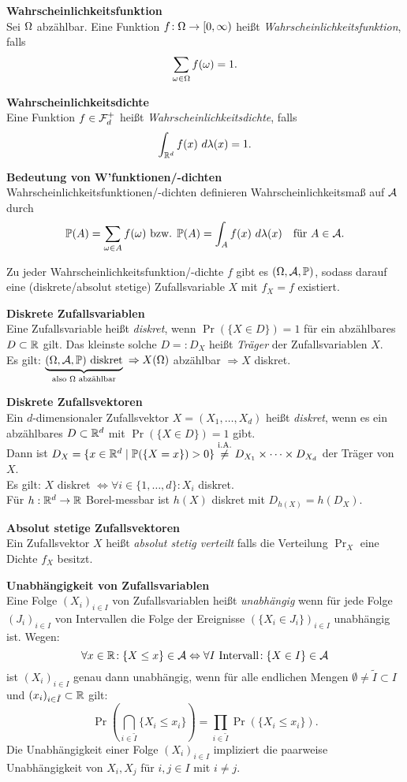 \textbf{Wahrscheinlichkeitsfunktion}\\
Sei $\Omega$ abzählbar.
Eine Funktion $f\!: \Omega \to [0,\infty)$ heißt
\textit{Wahrscheinlichkeitsfunktion}, falls
\[
  \sum_{\omega\in\Omega} f(\omega) = 1.
\]

\textbf{Wahrscheinlichkeitsdichte}\\
Eine Funktion $f\in\mathcal{F}_d^+$ heißt \textit{Wahrscheinlichkeitsdichte},
falls
\[
  \int_{\mathbb{R}^d} f(x)~d\lambda(x) = 1.
\]

\textbf{Bedeutung von W'funktionen/-dichten}\\
Wahrscheinlichkeitsfunktionen/-dichten definieren Wahrscheinlichkeitsmaß auf
$\mathcal{A}$ durch
\[
  \mathbb{P}(A) = \sum_{\omega \in A} f(\omega) \text{ bzw. } \mathbb{P}(A) = \int_A f(x)~d\lambda(x)
  \quad \text{für } A\in\mathcal{A}.
\]

Zu jeder Wahrscheinlichkeitsfunktion/-dichte $f$ gibt es $(\Omega,\mathcal{A},\mathbb{P})$, sodass
darauf eine (diskrete/absolut stetige) Zufallsvariable $X$ mit
$f_X = f$ existiert.

\textbf{Diskrete Zufallsvariablen}\\
Eine Zufallsvariable heißt \textit{diskret}, wenn $\Pr(\{X \in D\}) = 1$
für ein abzählbares $D\subset\mathbb{R}$ gilt.
Das kleinste solche $D =: D_X$ heißt \textit{Träger} der Zufallsvariablen $X$.\\
Es gilt:
$\underbrace{(\Omega,\mathcal{A},\mathbb{P}) \text{ diskret}}_{\text{also $\Omega$ abzählbar}}$
$\Rightarrow X(\Omega)$ abzählbar $\Rightarrow X$ diskret.

\textbf{Diskrete Zufallsvektoren}\\
Ein $d$-dimensionaler Zufallsvektor $X = (X_1,\ldots,X_d)$ heißt \textit{diskret},
wenn es ein abzählbares $D\subset\mathbb{R}^d$ mit $\Pr(\{X \in D\}) = 1$ gibt.\\
Dann ist $D_X = \{x\in\mathbb{R}^d \mid \mathbb{P}(\{X=x\})>0\}
\overset{\text{i.A.}}{\neq} D_{X_1} \times\cdots\times D_{X_d}$
der Träger von $X$.\\
Es gilt: $X$ diskret $\Leftrightarrow \forall i\in\{1,\ldots,d\}\!: X_i$ diskret.\\
Für $h:\mathbb{R}^d\to\mathbb{R}$ Borel-messbar ist $h(X)$ diskret mit $D_{h(X)} = h(D_X)$.

\textbf{Absolut stetige Zufallsvektoren}\\
Ein Zufallsvektor $X$ heißt \textit{absolut stetig verteilt} falls die
Verteilung $\Pr_X$ eine Dichte $f_X$ besitzt.

\textbf{Unabhängigkeit von Zufallsvariablen}\\
Eine Folge $(X_i)_{i \in I}$ von Zufallsvariablen heißt \textit{unabhängig} wenn
für jede Folge $(J_i)_{i \in I}$ von Intervallen die Folge der Ereignisse
$(\{X_i \in J_i\})_{i \in I}$ unabhängig ist.
Wegen:
\[
  \forall x\in\mathbb{R}\!: \{X \leq x\} \in \mathcal{A}
  \Leftrightarrow \forall I \text{ Intervall}\!: \{X \in I\} \in \mathcal{A}
\]
ist $(X_i)_{i \in I}$ genau dann unabhängig, wenn für alle endlichen Mengen
$\emptyset \neq \tilde{I} \subset I$ und
\mbox{$(x_i)_{i\in\tilde{I}}\subset\mathbb{R}$} gilt:
\[
  \Pr\left(\bigcap_{i\in\tilde{I}} \{X_i \leq x_i\}\right)=
  \prod_{i\in\tilde{I}} \Pr(\{X_i \leq x_i\}).
\]
Die Unabhängigkeit einer Folge $(X_i)_{i \in I}$ impliziert die paarweise
Unabhängigkeit von $X_i,X_j$ für $i,j \in I$ mit $i \neq j$.


